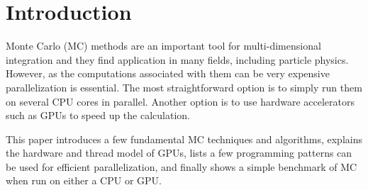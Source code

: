 \section*{Introduction}
Monte Carlo (MC) methods are an important tool for multi-dimensional integration
and they find application in many fields, including particle physics.
However, as the computations associated with them can be very expensive parallelization is essential.
The most straightforward option is to simply run them on several CPU cores in parallel.
Another option is to use hardware accelerators such as GPUs to speed up the calculation.

This paper introduces a few fundamental MC techniques and algorithms,
explains the hardware and thread model of GPUs,
lists a few programming patterns can be used for efficient parallelization,
and finally shows a simple benchmark of MC when run on either a CPU or GPU.
